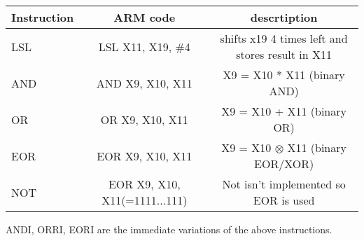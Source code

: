 \documentclass[a4paper]{scrartcl}
\begin{document}
            \begin{center}
                \begin{tabular}{|l|c|c|}
                    \hline
                    Instruction & ARM code & descrtiption \\
                    \hline
                    LSL & LSL X11, X19, \#4 & shifts x19 4 times left and stores result in X11 \\
                    \hline
                    AND & AND X9, X10, X11 & X9 = X10 * X11 (binary AND) \\
                    \hline
                    OR & OR X9, X10, X11 & X9 = X10 + X11 (binary OR) \\
                    \hline 
                    EOR & EOR X9, X10, X11 & X9 = X10 \(\otimes \) X11 (binary EOR/XOR) \\
                    \hline
                    NOT & EOR X9, X10, X11(=1111...111) & Not isn't implemented so EOR is used \\
                    \hline 
                \end{tabular}
            \end{center}
            ANDI, ORRI, EORI are the immediate variations of the above instructions.
\end{document}
